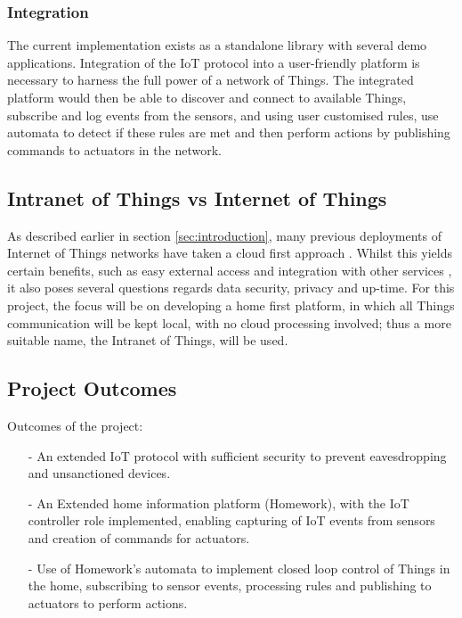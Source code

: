 \documentclass{mprop}
\begin{document}
\subsubsection{Integration} %
\label{ssub:integration}

The current implementation exists as a standalone library with several demo applications. Integration of the IoT protocol into a user-friendly platform is necessary to harness the full power of a network of Things. The integrated platform would then be able to discover and connect to available Things, subscribe and log events from the sensors, and using user customised rules, use automata to detect if these rules are met and then perform actions by publishing commands to actuators in the network.

\subsection{Intranet of Things vs Internet of Things} %
\label{sub:intranet_of_things}

As described earlier in section \ref{sec:introduction}, many previous deployments of Internet of Things networks have taken a cloud first approach \cite{SmartThings, Twine}. Whilst this yields certain benefits, such as easy external access and integration with other services \cite{IFTTT, Xively}, it also poses several questions regards data security, privacy and up-time. For this project, the focus will be on developing a home first platform, in which all Things communication will be kept local, with no cloud processing involved; thus a more suitable name, the Intranet of Things, will be used. 

\subsection{Project Outcomes} %
\label{sub:project_outcomes}

Outcomes of the project:
\begin{itemize}
  \item[-] An extended IoT protocol with sufficient security to prevent eavesdropping and unsanctioned devices.
  \item[-] An Extended home information platform (Homework), with the IoT controller role implemented, enabling capturing of IoT events from sensors and creation of commands for actuators.
  \item[-] Use of Homework's automata to implement closed loop control of Things in the home, subscribing to sensor events, processing rules and publishing to actuators to perform actions.
\end{itemize}
\end{document}
